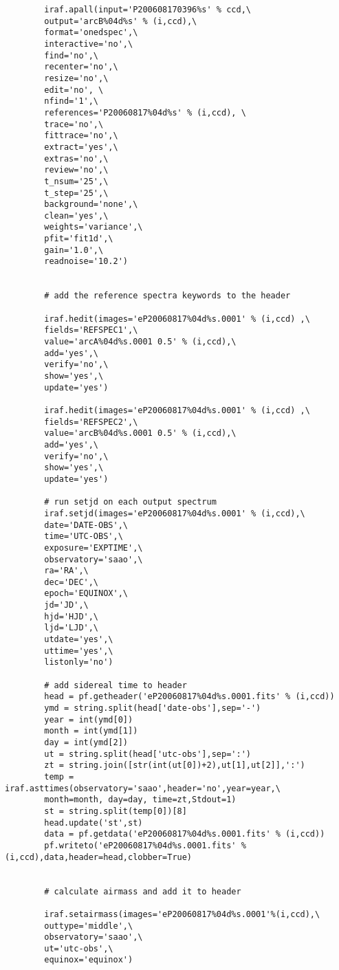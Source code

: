 \begin{footnotesize}
\begin{verbatim}
        iraf.apall(input='P200608170396%s' % ccd,\
        output='arcB%04d%s' % (i,ccd),\
        format='onedspec',\
        interactive='no',\
        find='no',\
        recenter='no',\
        resize='no',\
        edit='no', \
        nfind='1',\
        references='P20060817%04d%s' % (i,ccd), \
        trace='no',\
        fittrace='no',\
        extract='yes',\
        extras='no',\
        review='no',\
        t_nsum='25',\
        t_step='25',\
        background='none',\
        clean='yes',\
        weights='variance',\
        pfit='fit1d',\
        gain='1.0',\
        readnoise='10.2')
        
        
        # add the reference spectra keywords to the header
        
        iraf.hedit(images='eP20060817%04d%s.0001' % (i,ccd) ,\
        fields='REFSPEC1',\
        value='arcA%04d%s.0001 0.5' % (i,ccd),\
        add='yes',\
        verify='no',\
        show='yes',\
        update='yes')
        
        iraf.hedit(images='eP20060817%04d%s.0001' % (i,ccd) ,\
        fields='REFSPEC2',\
        value='arcB%04d%s.0001 0.5' % (i,ccd),\
        add='yes',\
        verify='no',\
        show='yes',\
        update='yes')
        
        # run setjd on each output spectrum
        iraf.setjd(images='eP20060817%04d%s.0001' % (i,ccd),\
        date='DATE-OBS',\
        time='UTC-OBS',\
        exposure='EXPTIME',\
        observatory='saao',\
        ra='RA',\
        dec='DEC',\
        epoch='EQUINOX',\
        jd='JD',\
        hjd='HJD',\
        ljd='LJD',\
        utdate='yes',\
        uttime='yes',\
        listonly='no')
        
        # add sidereal time to header
        head = pf.getheader('eP20060817%04d%s.0001.fits' % (i,ccd))
        ymd = string.split(head['date-obs'],sep='-')
        year = int(ymd[0])
        month = int(ymd[1])
        day = int(ymd[2])
        ut = string.split(head['utc-obs'],sep=':')
        zt = string.join([str(int(ut[0])+2),ut[1],ut[2]],':')
        temp = iraf.asttimes(observatory='saao',header='no',year=year,\
        month=month, day=day, time=zt,Stdout=1)
        st = string.split(temp[0])[8]
        head.update('st',st)
        data = pf.getdata('eP20060817%04d%s.0001.fits' % (i,ccd))
        pf.writeto('eP20060817%04d%s.0001.fits' % (i,ccd),data,header=head,clobber=True)
        
        
        # calculate airmass and add it to header
        
        iraf.setairmass(images='eP20060817%04d%s.0001'%(i,ccd),\
        outtype='middle',\
        observatory='saao',\
        ut='utc-obs',\
        equinox='equinox')






\end{verbatim}

\end{footnotesize} 
